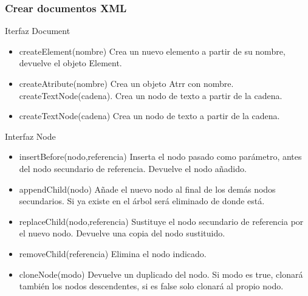 \documentclass{beamer}
\begin{document}
\begin{frame}
\frametitle{Crear documentos XML}
\begin{scriptsize}

\begin{block}{Iterfaz Document}
\begin{itemize}[<+->]
\item \alert{createElement(nombre)} Crea un nuevo elemento a partir de su nombre, devuelve el objeto Element.
\item \alert{createAtribute(nombre)} Crea un objeto Atrr con nombre.
createTextNode(cadena). Crea un nodo de texto a partir de la cadena.
\item \alert{createTextNode(cadena)} Crea un nodo de texto a partir de la cadena.
\end{itemize}
\end{block}

\begin{block}{Interfaz Node}
\begin{itemize}[<+->]
\item \alert{insertBefore(nodo,referencia)} Inserta el nodo pasado como parámetro, antes del nodo secundario de referencia. Devuelve el nodo añadido.
\item \alert{appendChild(nodo)} Añade el nuevo nodo al final de los demás nodos secundarios. Si ya existe en el árbol será eliminado de donde está.
\item \alert{replaceChild(nodo,referencia)} Sustituye el nodo secundario de referencia por el nuevo nodo. Devuelve una copia del nodo sustituido. 
\item \alert{removeChild(referencia)} Elimina el nodo indicado.
\item \alert{cloneNode(modo)} Devuelve un duplicado del nodo. Si modo es true,
clonará también los nodos descendentes, si es false solo clonará al propio nodo.
\end{itemize}
\end{block}

\end{scriptsize}
\end{frame}
\end{document}
